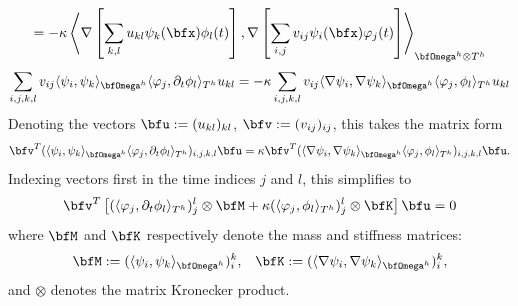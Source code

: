 \begin{example}
\begin{multline}
            =  - \kappa\left\langle\nabla\left[\sum_{k, l}u_{kl}\psi_{k}(\bfx)\phi_{l}(t)\right], \nabla\left[\sum_{i, j}v_{ij}\psi_{i}(\bfx)\varphi_{j}(t)\right]\right\rangle_{\bfOmega^{h}\otimes T^{h}}
        \end{multline}
        \begin{equation}
            \sum_{i, j, k, l}v_{ij}\langle\psi_{i}, \psi_{k}\rangle_{\bfOmega^{h}}\langle\varphi_{j}, \partial_{t}\phi_{l}\rangle_{T^{h}}u_{kl}  =  - \kappa\sum_{i, j, k, l}v_{ij}\langle\nabla\psi_{i}, \nabla\psi_{k}\rangle_{\bfOmega^{h}}\langle\varphi_{j}, \phi_{l}\rangle_{T^{h}}u_{kl}
        \end{equation}
        Denoting the vectors $\bfu  :=  (u_{kl})_{kl}$, $\bfv  :=  (v_{ij})_{ij}$, this takes the matrix form
        \begin{equation}
            \bfv^{T}(\langle\psi_{i}, \psi_{k}\rangle_{\bfOmega^{h}}\langle\varphi_{j}, \partial_{t}\phi_{l}\rangle_{T^{h}})_{i, j, k, l}\bfu  =  \kappa\bfv^{T}(\langle\nabla\psi_{i}, \nabla\psi_{k}\rangle_{\bfOmega^{h}}\langle\varphi_{j}, \phi_{l}\rangle_{T^{h}})_{i, j, k, l}\bfu.
        \end{equation}
        Indexing vectors first in the time indices $j$ and $l$, this simplifies to
        \begin{equation}
            \bfv^{T}\left[(\langle\varphi_{j}, \partial_{t}\phi_{l}\rangle_{T^{h}})_{j}^{l}\otimes\bfM + \kappa(\langle\varphi_{j}, \phi_{l}\rangle_{T^{h}})_{j}^{l}\otimes\bfK\right]\bfu  =  0
        \end{equation}
        where $\bfM$ and $\bfK$ respectively denote the mass and stiffness matrices:
        \begin{align}
            \bfM  :=  (\langle\psi_{i}, \psi_{k}\rangle_{\bfOmega^{h}})_{i}^{k},  &&
            \bfK  :=  (\langle\nabla\psi_{i}, \nabla\psi_{k}\rangle_{\bfOmega^{h}})_{i}^{k},
        \end{align}
        and $\otimes$ denotes the matrix Kronecker product.
        

\end{example}
